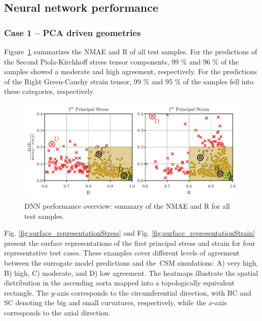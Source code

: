 \documentclass[a4paper,fleqn]{cas-sc}
\begin{document}
\subsection{Neural network performance} 
  \subsubsection{Case 1 -- PCA driven geometries}
    Figure~\ref{fig:performance_overview} summarizes the NMAE and R of all test samples. For the predictions of the Second Piola-Kirchhoff stress tensor components, 99 \% and 96 \% of the samples showed a moderate and high agreement, respectively. For the predictions of the Right Green-Cauchy strain tensor, 99 \% and 95 \% of the samples fell into these categories, respectively.
        
    \begin{figure}
      \centering
      \includegraphics[width=\textwidth]{fig3}
      \caption{\gls{DNN} performance overview: summary of the NMAE and R for all test samples.}
      \label{fig:performance_overview}
    \end{figure}

    Fig. \ref{fig:surface_representationStress} and Fig. \ref{fig:surface_representationStrain} present the surface representations of the first principal stress and strain for four representative test cases. These examples cover different levels of agreement between the surrogate model predictions and the~\gls{CSM} simulations: A) very high, B) high, C) moderate, and D) low agreement. The heatmaps illustrate the spatial distribution in the ascending aorta mapped into a topologically equivalent rectangle. The $y$-axis corresponds to the circumferential direction, with BC and SC denoting the big and small curvatures, respectively, while the $x$-axis corresponds to the axial direction.
\end{document}
